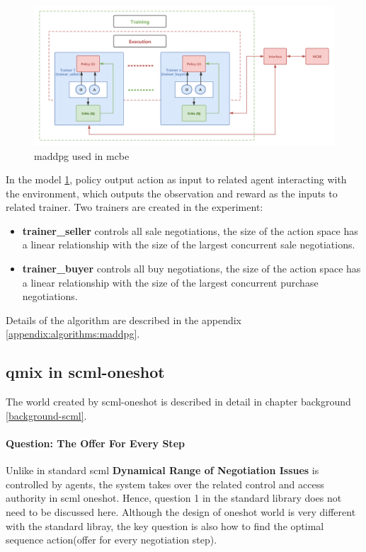 \begin{figure}[htbp]
\centering
\includegraphics[width=1.00\textwidth]{./images/scml-maddpg.png}
\caption{\gls{maddpg} used in \gls{mcbe}}
\label{fig:method-maddpg-scml}
\end{figure}

In the model \ref{fig:method-maddpg-scml}, policy output action as input to related agent interacting with the environment, which outputs the observation and reward as the inputs to related trainer. Two trainers are created in the experiment:
\begin{itemize}
\item \textbf{trainer\_seller} controls all sale negotiations, the size of the action space has a linear relationship with the size of the largest concurrent sale negotiations.
\item \textbf{trainer\_buyer} controls all buy negotiations, the size of the action space has a linear relationship with the size of the largest concurrent purchase negotiations.
\end{itemize}

Details of the algorithm are described in the appendix \ref{appendix:algorithms:maddpg}.  


\subsection{\gls{qmix} in \gls{scml-oneshot}} \label{methods:qmix-scml-oneshot}

The world created by \gls{scml-oneshot} is described in detail in chapter background \ref{background-scml}. 

\paragraph{Question: The Offer For Every Step} Unlike in standard scml \textbf{Dynamical Range of Negotiation Issues} is controlled by agents, the system takes over the related control and access authority in scml oneshot. Hence, question 1 in the standard library does not need to be discussed here. Although the design of oneshot world is very different with the standard libray, the key question is also how to find the optimal sequence action(offer for every negotiation step).


